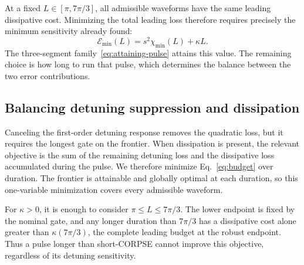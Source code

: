 \documentclass[12pt]{iopjournal}
\begin{document}
At a fixed $L\in[\pi,7\pi/3]$, all admissible waveforms have the
same leading dissipative cost. Minimizing the total leading loss
therefore requires precisely the minimum sensitivity already found:
\begin{equation}
 \boxed{\mathcal E_{\min}(L)=s^2\chi_{\min}(L)+\kappa L.}
 \label{eq:budget}
\end{equation}
The three-segment family~\eqref{eq:attaining-pulse} attains this value.
The remaining choice is how long to run that pulse, which determines
the balance between the two error contributions.



\FloatBarrier
\subsection{Balancing detuning suppression and dissipation}

Canceling the first-order detuning response removes the quadratic
loss, but it requires the longest gate on the frontier. When
dissipation is present, the relevant objective is the sum of the
remaining detuning loss and the dissipative loss accumulated during
the pulse. We therefore minimize Eq.~\eqref{eq:budget} over duration.
The frontier is attainable and globally optimal at each duration,
so this one-variable minimization covers every admissible waveform.

For $\kappa>0$, it is enough to consider $\pi\le L\le7\pi/3$.
The lower endpoint is fixed by the nominal gate, and any longer
duration than $7\pi/3$ has a dissipative cost alone greater than
$\kappa(7\pi/3)$, the complete leading budget at the robust endpoint.
Thus a pulse longer than short-CORPSE cannot improve this objective,
regardless of its detuning sensitivity.
\end{document}
